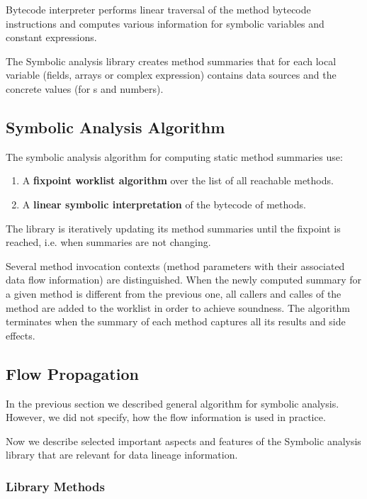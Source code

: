 Bytecode interpreter performs linear traversal of the method bytecode instructions
and computes various information for symbolic variables and constant expressions.

The Symbolic analysis library creates method summaries that for each
local variable (fields, arrays or complex expression) contains
data sources and the concrete values (for s and numbers).



\subsection{Symbolic Analysis Algorithm}

The symbolic analysis algorithm for computing static method summaries use:
\begin{enumerate}
  \item A \textbf{fixpoint worklist algorithm} over the list of all reachable methods.
  \item A \textbf{linear symbolic interpretation} of the bytecode of methods.
\end{enumerate}

The library is iteratively updating its method summaries until the fixpoint is reached, i.e.
when summaries are not changing.

Several method invocation contexts (method parameters with their associated data flow information)
are distinguished. When the newly computed summary for a given method is different from the previous
one, all callers and calles of the method are added to the worklist in order to achieve soundness.
The algorithm terminates when the summary of each method captures all its results and side effects.




\subsection{Flow Propagation}

In the previous section we described general algorithm for symbolic analysis.
However, we did not specify, how the flow information is used in practice.

Now we describe selected important aspects and features of the Symbolic analysis library
that are relevant for data lineage information.




\subsubsection{Library Methods}

